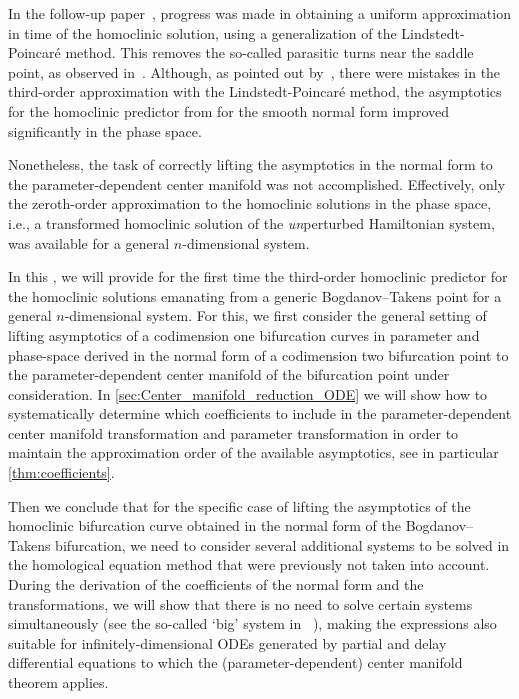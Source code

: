 In the follow-up paper~\cite{Al-Hdaibat2016}, progress was made in obtaining a
uniform approximation in time of the homoclinic solution, using a
generalization of the Lindstedt-Poincar\'e method. This removes the so-called
parasitic turns near the saddle point, as observed
in~\cite{Kuznetsov2014improved}. Although, as pointed out
by~\cite{Algaba_2019}, there were mistakes in the third-order approximation
with the Lindstedt-Poincar\'e method, the asymptotics for the homoclinic predictor from
\cite{Kuznetsov2014improved} for the smooth normal form improved significantly
in the phase space.

Nonetheless, the task of correctly lifting the asymptotics in the normal
form to the parameter-dependent center manifold was not accomplished. 
Effectively, only the zeroth-order approximation to the homoclinic
solutions in the phase space, i.e., a transformed homoclinic solution of the
\emph{un}perturbed Hamiltonian system, was available for a general $n$-dimensional
system.

In this \paper{}, we will provide for the first time the third-order homoclinic
predictor for the homoclinic solutions emanating from a generic Bogdanov--Takens
point for a general $n$-dimensional system. For this, we first consider the general
setting of lifting asymptotics of a codimension one bifurcation curves in parameter and phase-space
derived in the normal form of a codimension two bifurcation point to the 
parameter-dependent center manifold of the bifurcation point under consideration.
In \cref{sec:Center_manifold_reduction_ODE} we will show how to systematically
determine which coefficients to include in the parameter-dependent center manifold
transformation and parameter transformation in order to maintain the approximation
order of the available asymptotics, see in particular \cref{thm:coefficients}.

Then we conclude that for the specific case of lifting the asymptotics of the
homoclinic bifurcation curve obtained in the normal form of the Bogdanov--Takens
bifurcation, we need to consider several additional systems to be solved in the
homological equation method that were previously not taken into account.
During the derivation of the coefficients of the normal form and the
transformations, we will show that there is no need to solve certain systems
simultaneously (see the so-called `big' system in
~\cite{Kuznetsov2014improved,Gray-Scott2015,Al-Hdaibat2016}), making the expressions also
suitable for infinitely-dimensional ODEs generated by partial and
delay differential equations to which the (parameter-dependent) center
manifold theorem applies. 

